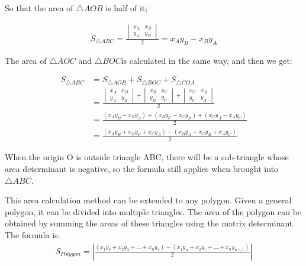 So that the area of $\triangle AOB$ is half of it;

\begin{equation}
\begin{split}
S_{\triangle ABC} =\frac{\begin{vmatrix}
  x_{A} &x_{B}  \\
  y_{A} &y_{B} 
\end{vmatrix}}{2}=x_{A}y_{B}-x_{B}y_{A}  
\end{split}
\end{equation}

The area of $\triangle AOC$ and $\triangle BOC$is calculated in the same way, and then we get:

\begin{equation}
\begin{split}
S_{\triangle ABC}
&=S_{\triangle AOB}+S_{\triangle BOC}+S_{\triangle COA}\\
&=\frac{\begin{vmatrix}
  x_{A} &x_{B}  \\
  y_{A} &y_{B} 
\end{vmatrix}+\begin{vmatrix}
  x_{B}& x_{C}\\
  y_{B}&y_{C}
\end{vmatrix}+\begin{vmatrix}
  x_{C}&x_{A} \\
  y_{C}&y_{A}
\end{vmatrix}}{2}\\
&=\frac{(x_{A}y_{B}-x_{B}y_{A})+(x_{B}y_{C}-x_{C}y_{B}) +(x_{C}y_{A}-x_{A}y_{C})  }{2}\\
&=\frac{(x_{A}y_{B}+x_{B}y_{C}+x_{C}y_{A})-(x_{B}y_{A}+x_{C}y_{B}+x_{A}y_{C})}{2}
\end{split}
\end{equation}

When the origin O is outside triangle ABC, there will be a sub-triangle whose area determinant is negative, so the formula still applies when brought into $\triangle ABC$.

This area calculation method can be extended to any polygon. Given a general polygon, it can be divided into multiple triangles. The area of the polygon can be obtained by summing the areas of these triangles using the matrix determinant.
The formula is:
\begin{equation}
\begin{split}
S_{Polygon}= \left | \frac{(x_{1}y_{2} +x_{2}y_{3}+...+x_{n}y_{1} )-(x_{1}y_{n} +x_{2}y_{1}+...+x_{n}y_{n-1})}{2}  \right | 
\end{split}
\end{equation}

